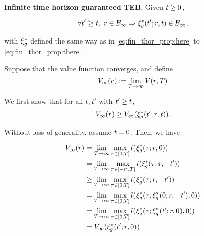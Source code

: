\begin{prop}
  \label{prop:main}
  \textbf{Infinite time horizon guaranteed TEB}. Given $t \ge 0$,
  
  \begin{equation}
  \forall t' \ge t, ~r\in\mathcal B_\infty \Rightarrow \xi_g^*(t'; r, t) \in \mathcal B_\infty,
  \end{equation}
  
  \noindent with $\xi_g^*$ defined the same way as in \eqref{eq:fin_thor_prop:here} to \eqref{eq:fin_thor_prop:there}.
  
\end{prop}


\begin{IEEEproof}
  
  Suppose that the value function converges, and define
  \begin{equation}
  \label{eq:conv_valfunc}
  \valfunc_\infty(\rstate) := \lim_{\thor\rightarrow\infty}\valfunc(\rstate, T)
  \end{equation}
  
  We first show that for all $t, t'$ with $t' \ge t$,
  \begin{equation}
  \label{eq:invariant}
  \valfunc_\infty(\rstate) \ge \valfunc_\infty(\rtraj^*(\tvar'; \rstate, \tvar)).
  \end{equation}
  
  Without loss of generality, assume $t=0$. Then, we have
  
  \begin{subequations} \label{eq:inf_thor_steps}
    \begin{align}
    \valfunc_\infty(\rstate) & = \lim_{\thor\rightarrow\infty}\max_{\tau \in [0, \thor]} \errfunc(\rtraj^*(\tau; \rstate, 0)) \label{eq:inf_thor_steps:1}\\
    &= \lim_{\thor\rightarrow\infty}\max_{\tau \in [-\tvar', \thor]} \errfunc(\rtraj^*(\tau; \rstate, -\tvar')) \label{eq:inf_thor_steps:2}\\
    &\ge \lim_{\thor\rightarrow\infty}\max_{\tau \in [0, \thor]} \errfunc(\rtraj^*(\tau; \rstate, -\tvar')) \label{eq:inf_thor_steps:3}\\
    & = \lim_{\thor\rightarrow\infty}\max_{\tau \in [0, \thor]} \errfunc(\rtraj^*(\tau; \rtraj^*(0; \rstate, -\tvar'), 0)) \label{eq:inf_thor_steps:4}\\
    & = \lim_{\thor\rightarrow\infty}\max_{\tau \in [0, \thor]} \errfunc(\rtraj^*(\tau; \rtraj^*(\tvar'; \rstate, 0), 0)) \label{eq:inf_thor_steps:5}\\
    & = \valfunc_\infty(\rtraj^*(\tvar'; \rstate, 0)) \label{eq:inf_thor_steps:6}
    \end{align}
  \end{subequations}
  

\end{IEEEproof}
